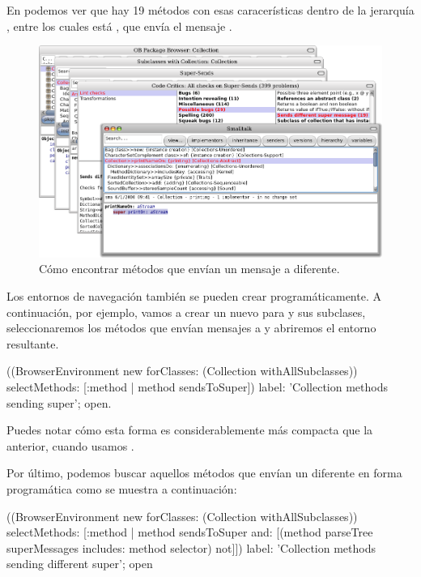 \documentclass[a4paper,10pt,twoside]{book}
\begin{document}
En  podemos ver que hay 19 métodos con esas
caracerísticas dentro de la jerarquía , entre los
cuales está , que envía el mensaje
.
\begin{figure}[ht]\centering
        \includegraphics[width=\linewidth]{sendDifferentSuper}
        \caption{Cómo encontrar métodos que envían un mensaje a \super diferente.}
\end{figure}

Los entornos de navegación también se pueden crear programáticamente.
A continuación, por ejemplo, vamos a crear un nuevo
 para  y sus subclases,
seleccionaremos los métodos que envían mensajes a \super y abriremos
el entorno resultante.
\begin{code}{}
((BrowserEnvironment new forClasses: (Collection withAllSubclasses))
        selectMethods: [:method | method sendsToSuper])
        label: 'Collection methods sending super';
        open.
\end{code}{}

Puedes notar cómo esta forma es considerablemente más compacta que la
anterior, cuando usamos .

Por último, podemos buscar aquellos métodos que envían un \super
diferente en forma programática como se muestra a continuación:
\begin{code}{}
((BrowserEnvironment new forClasses: (Collection withAllSubclasses))
        selectMethods: [:method |
                method sendsToSuper
                and: [(method parseTree superMessages includes: method selector) not]])
        label: 'Collection methods sending different super';
        open
\end{code}
\end{document}
